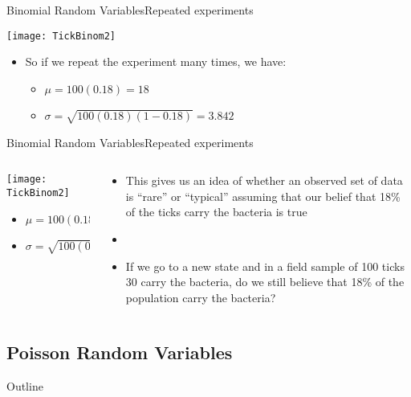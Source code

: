\documentclass[xcolor=dvipsnames]{beamer}
\begin{document}
\begin{frame}{Binomial Random Variables}{Repeated experiments}
	\begin{center}
		\texttt{[image: TickBinom2]}
	\end{center}
	\begin{itemize}
		\item So if we repeat the experiment many times, we have:
		\begin{itemize}
			\item $\mu = 100 (0.18) = 18$
			\item $\sigma = \sqrt{100 (0.18) (1-0.18)} = 3.842$
		\end{itemize}
	\end{itemize}
\end{frame}

\begin{frame}{Binomial Random Variables}{Repeated experiments}
	\begin{columns}
		\begin{column}{0.5 \textwidth}
				\begin{center}
				\texttt{[image: TickBinom2]}
			\end{center}
		\begin{itemize}
			\item $\mu = 100 (0.18) = 18$
			\item $\sigma = \sqrt{100 (0.18) (1-0.18)} = 3.842$
		\end{itemize}
		\end{column}
		\begin{column}{0.5 \textwidth}
			\begin{itemize}
				\item This gives us an idea of whether an observed set of data is ``rare'' or ``typical'' assuming that our belief that 18\% of the ticks carry the bacteria is true \pause
				\item[]
				\item If we go to a new state and in a field sample of 100 ticks 30 carry the bacteria, do we still believe that 18\% of the population carry the bacteria?
			\end{itemize}
		\end{column}
	\end{columns}
\end{frame}

\subsection{Poisson Random Variables}
\begin{frame}{Outline}
	\tableofcontents[currentsection,subsectionstyle=show/shaded/hide]
\end{frame}
\end{document}
